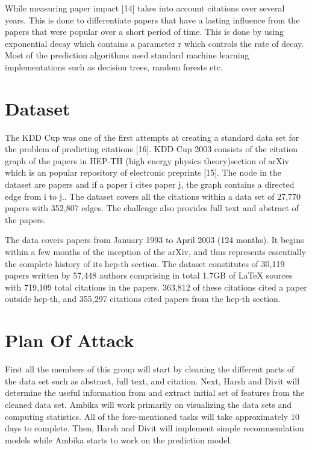 \documentclass[journal]{IEEEtran}
\begin{document}
While measuring paper impact [14] takes into account citations over several years.  This is done to differentiate papers that have a lasting influence from the papers that were popular over a short period of time.  This is done by using exponential decay which contains a parameter r which controls the rate of decay.  Most of the prediction algorithms used standard machine learning implementations such as decision trees, random forests etc.

\section{Dataset}

 The KDD Cup was one of the first attempts at creating a standard data set for the problem of predicting citations [16]. KDD Cup 2003 consists of the citation graph of the papers in  HEP-TH (high energy physics theory)section of arXiv which is an  popular repository of electronic preprints [15]. The node in the dataset are papers and if a paper i cites paper j, the graph contains a directed edge from i to j.. The dataset covers all the citations within a data set of 27,770 papers with 352,807 edges.  The challenge also provides full text and abstract of the papers.
 
The data covers papers from January 1993 to April 2003 (124 months). It begins within a few months of the inception of the arXiv, and thus represents essentially the complete history of its hep-th section. The dataset constitutes of 30,119 papers written by 57,448 authors comprising in total 1.7GB of LaTeX sources with 719,109 total citations in the papers. 363,812 of these citations cited a paper outside hep-th, and 355,297 citations cited papers from the hep-th section.

\section{Plan Of Attack}
First all the members of this group will start by cleaning the different parts of the data set such as abstract, full text, and citation.  Next, Harsh and Divit will determine the useful information from and extract initial set of features from the cleaned data set.  Ambika will work primarily on visualizing the data sets and computing statistics.  All of the fore-mentioned tasks will take approximately 10 days to complete.  Then, Harsh and Divit will implement simple recommendation models while Ambika starts to work on the prediction model.  
\end{document}
